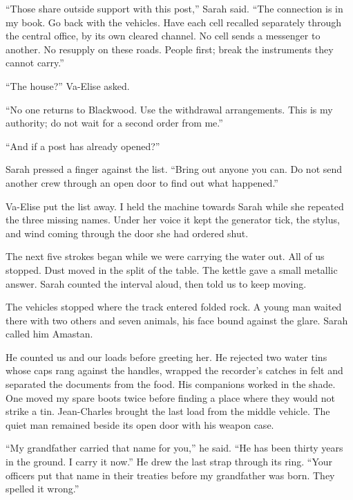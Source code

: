 ``Those share outside support with this post,'' Sarah said. ``The connection is in my book. Go back with the vehicles. Have each cell recalled separately through the central office, by its own cleared channel. No cell sends a messenger to another. No resupply on these roads. People first; break the instruments they cannot carry.''\par

``The house?'' Va-Elise asked.\par

``No one returns to Blackwood. Use the withdrawal arrangements. This is my authority; do not wait for a second order from me.''\par

``And if a post has already opened?''\par

Sarah pressed a finger against the list. ``Bring out anyone you can. Do not send another crew through an open door to find out what happened.''\par

Va-Elise put the list away. I held the machine towards Sarah while she repeated the three missing names. Under her voice it kept the generator tick, the stylus, and wind coming through the door she had ordered shut.\par

The next five strokes began while we were carrying the water out. All of us stopped. Dust moved in the split of the table. The kettle gave a small metallic answer. Sarah counted the interval aloud, then told us to keep moving.\par

\ornament

The vehicles stopped where the track entered folded rock. A young man waited there with two others and seven animals, his face bound against the glare. Sarah called him Amastan.\par

He counted us and our loads before greeting her. He rejected two water tins whose caps rang against the handles, wrapped the recorder's catches in felt and separated the documents from the food. His companions worked in the shade. One moved my spare boots twice before finding a place where they would not strike a tin. Jean-Charles brought the last load from the middle vehicle. The quiet man remained beside its open door with his weapon case.\par

``My grandfather carried that name for you,'' he said. ``He has been thirty years in the ground. I carry it now.'' He drew the last strap through its ring. ``Your officers put that name in their treaties before my grandfather was born. They spelled it wrong.''\par

